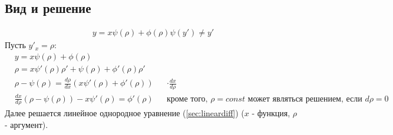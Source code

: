 \documentclass[fontsize=10pt,a4paper,fleqn]{scrreprt} %
\numberwithin{equation}{section}
\begin{document}
\subsection{Вид и решение}
\begin{align}
\label{eq:lagrange}
  y = x \psi(\rho) + \phi(\rho)
  \psi(y') \neq y'
\end{align}
Пусть $y'_x = \rho$:
\begin{align*}
&  y = x\psi(\rho) + \phi(\rho)\\
&  \rho = x\psi'(\rho)\rho' + \psi(\rho) + \phi'(\rho)\rho'\\
&  \rho - \psi(\rho) = \frac{d\rho}{dx}(x\psi'(\rho) + \phi'(\rho)) && \cdot\frac{dx}{d\rho} \\
& \frac{dx}{d\rho}(\rho - \psi(\rho)) - x\psi'(\rho) =  \phi'(\rho) && \text{кроме того, } \rho = const \text{ может являться решением, если } d\rho = 0
\end{align*}
Далее решается линейное однородное уравнение (\ref{sec:lineardiff}) ($x$ - функция, $\rho$ - аргумент).
\end{document}
